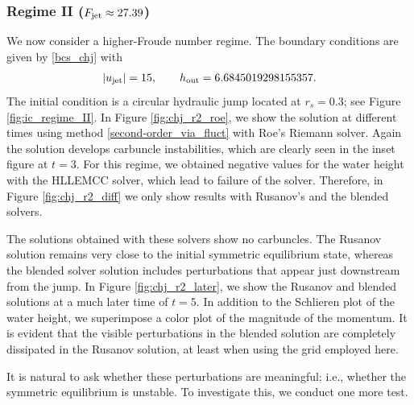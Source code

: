 \documentclass[preprint, 11pt]{article}
\newcommand{\out}{\textup{out}}
\newcommand{\jet}{{\textup{jet}}}
\newcommand{\bfu}{{u}}
\begin{document}
\subsubsection{Regime II ($F_\jet\approx27.39$)}\label{sec:regime_ii}
We now consider a higher-Froude number regime. The boundary conditions are
given by \eqref{bcs_chj} with 
\begin{align}\label{bcs_chj_r2}
  |\bfu_\jet|=15, \qquad h_\out=6.6845019298155357.
\end{align}
The initial condition is a circular hydraulic jump located at $r_s=0.3$; see Figure \ref{fig:ic_regime_II}.
In Figure \ref{fig:chj_r2_roe}, we show the solution at different times using method
\eqref{second-order_via_fluct} with Roe's Riemann solver. Again the solution develops
carbuncle instabilities, which are clearly seen in the inset figure at $t=3$.
For this regime, we obtained negative values for the water height with
the HLLEMCC solver, which lead to failure of the solver. Therefore, in Figure
\ref{fig:chj_r2_diff} we only show results with Rusanov's and the blended
solvers.  

The solutions obtained with these solvers show no carbuncles.  The Rusanov
solution remains very close to the initial symmetric equilibrium state,
whereas the blended solver solution includes perturbations that appear
just downstream from the jump.
In Figure \ref{fig:chj_r2_later}, we show the Rusanov and blended solutions at
a much later time of $t=5$.  In addition to the Schlieren plot of the water
height, we superimpose a color plot of the magnitude of the momentum. 
It is evident that the visible perturbations in the blended solution are
completely dissipated in the Rusanov solution, at least when using the grid employed here.

It is natural to ask whether these perturbations are meaningful; i.e., whether
the symmetric equilibrium is unstable.  To investigate this, we conduct one
more test.
\end{document}
